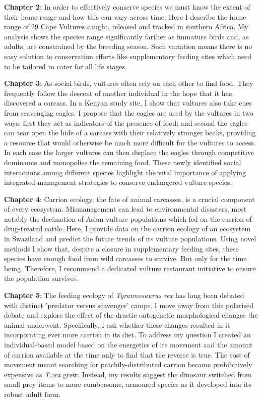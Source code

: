 \textbf{Chapter 2}:
In order to effectively conserve species we must know the extent of their home range and how this can vary across time. Here I describe the home range of 29 Cape Vultures caught, released and tracked in southern Africa. My analysis shows the species range significantly farther as immature birds and, as adults, are constrained by the breeding season. Such variation means there is no easy solution to conservation efforts like supplementary feeding sites which need to be tailored to cater for all life stages. 
\vspace{10 mm}


\textbf{Chapter 3}:
As social birds, vultures often rely on each other to find food. They frequently follow the descent of another individual in the hope that it has discovered a carcass. In a Kenyan study site, I show that vultures also take cues from scavenging eagles. I propose that the eagles are used by the vultures in two ways: first they act as indicators of the presence of food; and second the eagles can tear open the hide of a carcass with their relatively stronger beaks, providing a resource that would otherwise be much more difficult for the vultures to access. In each case the larger vultures can then displace the eagles through competitive dominance and monopolise the remaining food. These newly identified social interactions among different species highlight the vital importance of applying integrated management strategies to conserve endangered vulture species.
\vspace{10 mm}

\textbf{Chapter 4}:
Carrion ecology, the fate of animal carcasses, is a crucial component of every ecosystem. Mismanagement can lead to environmental disasters, most notably the decimation of Asian vulture populations which fed on the carrion of drug-treated cattle. Here, I provide data on the carrion ecology of an ecosystem in Swaziland and predict the future trends of its vulture populations. Using novel methods I show that, despite a closure in supplementary feeding sites, these species have enough food from wild carcasses to survive. But only for the time being. Therefore, I recommend a dedicated vulture restaurant initiative to ensure the population survives.
\vspace{10 mm}

\textbf{Chapter 5}:
The feeding ecology of \textit{Tyrannosaurus rex} has long been debated with distinct 'predator versus scavenger' camps. I move away from this polarised debate and explore the effect of the drastic ontogenetic morphological changes the animal underwent. Specifically, I ask whether these changes resulted in it incorporating ever more carrion in its diet. To address my question I created an individual-based model based on the energetics of its movement and the amount of carrion available at the time only to find that the reverse is true. The cost of movement meant searching for patchily-distributed carrion became prohibitively expensive as \textit{T.rex} grew. Instead, my results suggest the dinosaur switched from small prey items to more cumbersome, armoured species as it developed into its robust adult form. 

